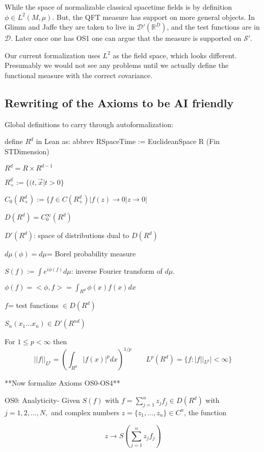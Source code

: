 \documentclass{article}
\newcommand{\1}{\mathbbm{1}}
\theoremstyle{plain}
\theoremstyle{definition}
\numberwithin{equation}{section}
\def\IR{\mathbb{R}}
\newcommand{\cD}{\mathcal D}
\newcommand{\cS}{\mathcal S}
\begin{document}
While the space of normalizable classical spacetime fields is by definition $\phi \in L^2(M,\mu)$.  But, the
QFT measure has support on more general objects.  In Glimm and Jaffe they are taken to live in
$\cD'(\IR^D)$, and the test functions are in $\cD$.  Later once one has OS1 one can argue that the measure
is supported on $\cS'$.

Our current formalization uses $L^2$ as the field space, which looks different.  Presumably we would not
see any problems until we actually define the functional measure with the correct covariance.




\subsection{Rewriting of the Axioms to be AI friendly}

Global definitions to carry through autoformalization:

define $R^d$ in Lean as: abbrev RSpaceTime := EuclideanSpace R (Fin STDimension)

$R^d = R \times R^{d-1}$

$R_+^d:= \{(t,\vec{x}| t> 0\}$

$C_0(R_+^d):= \{ f \in C(R_+^d)| f(z) \rightarrow 0 |z \rightarrow 0|$

$D(R^d)= C_0^{\infty} (R^d)$ 

$D'(R^d)$: space of distributions dual to $D(R^d)$

$d \mu (\phi)= d \mu$= Borel probability measure

$S(f):= \int e^{i \phi(f)} d \mu$: inverse Fourier transform of $d \mu$. 

$\phi(f) = < \phi, f>= \int_{R^d }\phi(x) f(x) dx$

$f$= test functions $\in D(R^d)$

$S_n(x_1 \ldots x_n) \in D'(R^{nd})$

For $1 \leq p < \infty$ then
\begin{equation}
    || f ||_{L^p}= (\int_{R^d} |f(x)|^p dx)^{1/p} \qquad L^p(R^d)= \{f: |f||_{L^p}| < \infty \}
\end{equation}

 **Now formalize Axioms OS0-OS4**

OS0: Analyticity-  Given $S (f) $ with $f = \sum_{j=1}^n z_j f_j \in D({R^d})$ with $j= 1,2, \ldots, N, $ and complex numbers $z= \{ z_1, \ldots, z_n\} \in C^n$, the function 

\begin{equation}
    z \rightarrow S (\sum_{j=1}^n  z_j f_j )
\end{equation}
\end{document}
